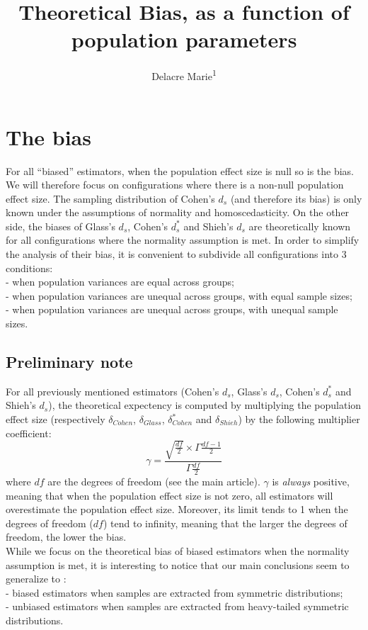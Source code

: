 \documentclass[
  english,
  man]{apa6}
\title{Theoretical Bias, as a function of population parameters}
\author{Delacre Marie\textsuperscript{1}}
\date{}
\affiliation{\vspace{0.5cm}\textsuperscript{1} ULB}
\begin{document}
\maketitle

\hypertarget{the-bias}{%
\section{The bias}\label{the-bias}}

For all \enquote{biased} estimators, when the population effect size is null so is the bias. We will therefore focus on configurations where there is a non-null population effect size. The sampling distribution of Cohen's \(d_s\) (and therefore its bias) is only known under the assumptions of normality and homoscedasticity. On the other side, the biases of Glass's \(d_s\), Cohen's \(d^*_s\) and Shieh's \(d_s\) are theoretically known for all configurations where the normality assumption is met. In order to simplify the analysis of their bias, it is convenient to subdivide all configurations into 3 conditions:\\
- when population variances are equal across groups;\\
- when population variances are unequal across groups, with equal sample sizes;\\
- when population variances are unequal across groups, with unequal sample sizes.

\hypertarget{preliminary-note}{%
\subsection{Preliminary note}\label{preliminary-note}}

For all previously mentioned estimators (Cohen's \(d_s\), Glass's \(d_s\), Cohen's \(d^*_s\) and Shieh's \(d_s\)), the theoretical expectency is computed by multiplying the population effect size (respectively \(\delta_{Cohen}\), \(\delta_{Glass}\), \(\delta^*_{Cohen}\) and \(\delta_{Shieh}\)) by the following multiplier coefficient:
\begin{equation} 
\gamma=\frac{\sqrt{\frac{df}{2}} \times \Gamma{\frac{df-1}{2}}}{\Gamma{\frac{df}{2}}}
\label{eq:mc}
\end{equation}
where \(df\) are the degrees of freedom (see the main article). \(\gamma\) is \emph{always} positive, meaning that when the population effect size is not zero, all estimators will overestimate the population effect size. Moreover, its limit tends to 1 when the degrees of freedom (\(df\)) tend to infinity, meaning that the larger the degrees of freedom, the lower the bias.\\
While we focus on the theoretical bias of biased estimators when the normality assumption is met, it is interesting to notice that our main conclusions seem to generalize to :\\
- biased estimators when samples are extracted from symmetric distributions;\\
- unbiased estimators when samples are extracted from heavy-tailed symmetric distributions.
\end{document}
